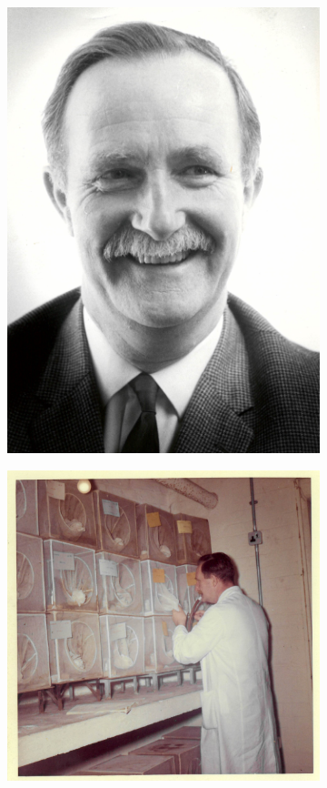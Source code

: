 \documentclass[a4paper,11pt,abstracton,hidelinks]{scrartcl}
\begin{document}
\begin{figure}[t]
\centering
\begin{subfigure}[t]{0.4\textwidth}
\includegraphics[width=1\textwidth,center]{artwork/chapter2/davidson-portrait.jpeg}
\end{subfigure}
\hfill
\begin{subfigure}[t]{0.57\textwidth}
\includegraphics[width=1\textwidth,center]{artwork/chapter2/davidson-colonies.jpeg}

\end{subfigure}
\end{figure}
\end{document}
